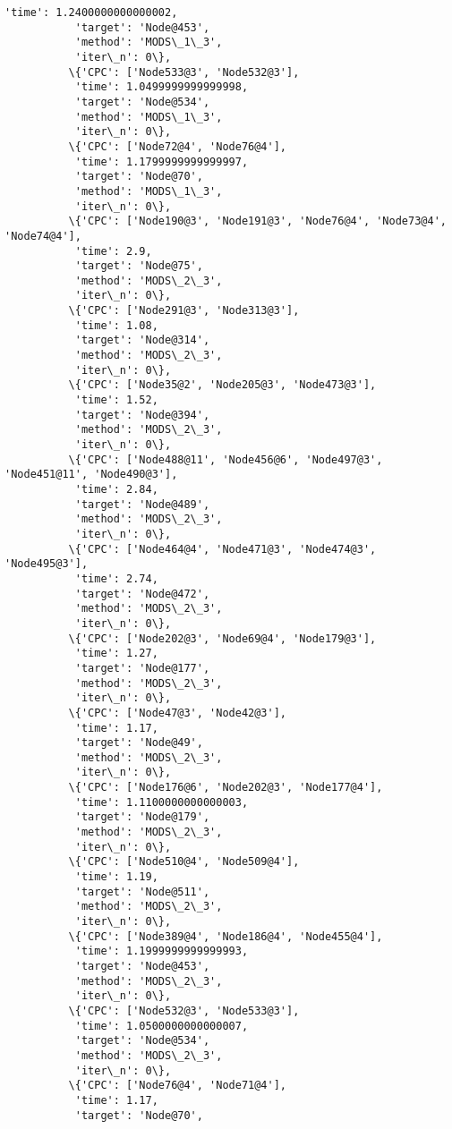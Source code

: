 \documentclass[11pt]{article}
\begin{document}
\begin{Verbatim}[commandchars=\\\{\}]
           'time': 1.2400000000000002,
           'target': 'Node@453',
           'method': 'MODS\_1\_3',
           'iter\_n': 0\},
          \{'CPC': ['Node533@3', 'Node532@3'],
           'time': 1.0499999999999998,
           'target': 'Node@534',
           'method': 'MODS\_1\_3',
           'iter\_n': 0\},
          \{'CPC': ['Node72@4', 'Node76@4'],
           'time': 1.1799999999999997,
           'target': 'Node@70',
           'method': 'MODS\_1\_3',
           'iter\_n': 0\},
          \{'CPC': ['Node190@3', 'Node191@3', 'Node76@4', 'Node73@4', 'Node74@4'],
           'time': 2.9,
           'target': 'Node@75',
           'method': 'MODS\_2\_3',
           'iter\_n': 0\},
          \{'CPC': ['Node291@3', 'Node313@3'],
           'time': 1.08,
           'target': 'Node@314',
           'method': 'MODS\_2\_3',
           'iter\_n': 0\},
          \{'CPC': ['Node35@2', 'Node205@3', 'Node473@3'],
           'time': 1.52,
           'target': 'Node@394',
           'method': 'MODS\_2\_3',
           'iter\_n': 0\},
          \{'CPC': ['Node488@11', 'Node456@6', 'Node497@3', 'Node451@11', 'Node490@3'],
           'time': 2.84,
           'target': 'Node@489',
           'method': 'MODS\_2\_3',
           'iter\_n': 0\},
          \{'CPC': ['Node464@4', 'Node471@3', 'Node474@3', 'Node495@3'],
           'time': 2.74,
           'target': 'Node@472',
           'method': 'MODS\_2\_3',
           'iter\_n': 0\},
          \{'CPC': ['Node202@3', 'Node69@4', 'Node179@3'],
           'time': 1.27,
           'target': 'Node@177',
           'method': 'MODS\_2\_3',
           'iter\_n': 0\},
          \{'CPC': ['Node47@3', 'Node42@3'],
           'time': 1.17,
           'target': 'Node@49',
           'method': 'MODS\_2\_3',
           'iter\_n': 0\},
          \{'CPC': ['Node176@6', 'Node202@3', 'Node177@4'],
           'time': 1.1100000000000003,
           'target': 'Node@179',
           'method': 'MODS\_2\_3',
           'iter\_n': 0\},
          \{'CPC': ['Node510@4', 'Node509@4'],
           'time': 1.19,
           'target': 'Node@511',
           'method': 'MODS\_2\_3',
           'iter\_n': 0\},
          \{'CPC': ['Node389@4', 'Node186@4', 'Node455@4'],
           'time': 1.1999999999999993,
           'target': 'Node@453',
           'method': 'MODS\_2\_3',
           'iter\_n': 0\},
          \{'CPC': ['Node532@3', 'Node533@3'],
           'time': 1.0500000000000007,
           'target': 'Node@534',
           'method': 'MODS\_2\_3',
           'iter\_n': 0\},
          \{'CPC': ['Node76@4', 'Node71@4'],
           'time': 1.17,
           'target': 'Node@70',

\end{Verbatim}
\end{document}
